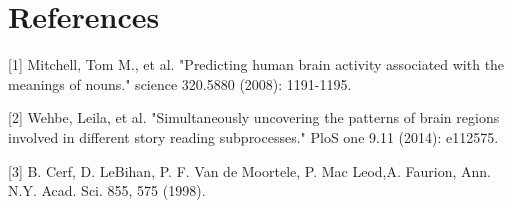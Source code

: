 \documentclass{article}
\begin{document}
\section*{References}
[1] Mitchell, Tom M., et al. "Predicting human brain activity associated with the meanings of nouns." science 320.5880 (2008): 1191-1195.  

[2] Wehbe, Leila, et al. "Simultaneously uncovering the patterns of brain regions involved in different story reading subprocesses." PloS one 9.11 (2014): e112575.

[3] B. Cerf, D. LeBihan, P. F. Van de Moortele, P. Mac Leod,A. Faurion, Ann. N.Y. Acad. Sci. 855, 575 (1998).
\end{document}
